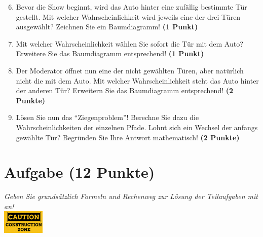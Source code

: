 \documentclass[a4paper, 9pt]{scrartcl}\usepackage[]{graphicx}\usepackage[]{xcolor}
\begin{document}
\begin{enumerate}
  \setcounter{enumi}{5}  
\item Bevor die Show beginnt, wird das Auto hinter eine zuf{\"a}llig bestimmte
  T{\"u}r gestellt. Mit welcher Wahrscheinlichkeit wird jeweils eine der drei
  T{\"u}ren ausgew{\"a}hlt? Zeichnen Sie ein Baumdiagramm! \textbf{(1 Punkt)}
\item Mit welcher Wahrscheinlichkeit w{\"a}hlen Sie sofort die T{\"u}r mit
  dem Auto? Erweitere Sie das Baumdiagramm entsprechend! \textbf{(1
    Punkt)}
\item Der Moderator {\"o}ffnet nun eine der nicht gew{\"a}hlten T{\"u}ren, aber
  nat{\"u}rlich nicht die mit dem Auto. Mit welcher Wahrscheinlichkeit steht
  das Auto hinter der anderen T{\"u}r? Erweitern Sie das Baumdiagramm
  entsprechend! \textbf{(2 Punkte)}
\item L{\"o}sen Sie nun das "`Ziegenproblem"'! Berechne Sie dazu die
  Wahrscheinlichkeiten der einzelnen Pfade. Lohnt sich ein Wechsel der
  anfangs gew{\"a}hlte T{\"u}r? Begr{\"u}nden Sie Ihre Antwort mathematisch!
  \textbf{(2 Punkte)}
\end{enumerate}
 






 
\clearpage

\section{Aufgabe \hfill (12 Punkte)}

\textit{Geben Sie grunds{\"a}tzlich Formeln und Rechenweg zur L{\"o}sung der
  Teilaufgaben mit an!} \\[1Ex]

\hfill\href{}{\includegraphics[width = 2cm]{img/caution}} %
\hspace{2Ex}
\end{document}
